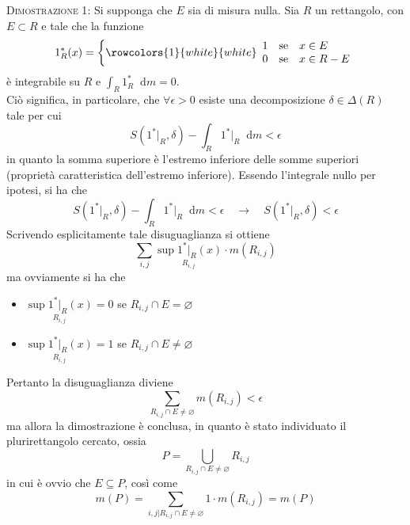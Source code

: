 \documentclass[a4paper]{extarticle}
\newcommand*\dif{\mathop{}\!\mathrm{d}}
\begin{document}
\vspace{2em}
\noindent
\normalfont \normalsize
\textsc{Dimostrazione 1}: Si supponga che $E$ sia di misura nulla. Sia $R$ un rettangolo, con $E \subset R$ e tale che la funzione
\[1^*_R(x) = \left\{\rowcolors{1}{white}{white}    
\begin{array}{lll}
    1 & \text{se} & x \in E\\
    0   & \text{se}  & x \in R - E\\
\end{array}
\right.\]
è integrabile su $R$ e $\displaystyle{\int_R 1^*_R \dif m = 0}$.\\
Ciò significa, in particolare, che $\forall \epsilon > 0$ esiste una decomposizione $\delta \in \Delta(R)$ tale per cui
\[S(1^* \vert_R, \delta) - \int_R 1^* \vert_R \dif m < \epsilon\]
in quanto la somma superiore è l'estremo inferiore delle somme superiori (proprietà caratteristica dell'estremo inferiore). Essendo l'integrale nullo per ipotesi, si ha che 
\[S(1^* \vert_R, \delta) - \int_R 1^* \vert_R \dif m < \epsilon \hspace{1em} \rightarrow \hspace{1em} S(1^* \vert_R, \delta) < \epsilon\]
Scrivendo esplicitamente tale disuguaglianza si ottiene
\[\sum_{i,j} \underset{R_{i,j}}{\sup 1^* \vert_R (x)} \cdot m(R_{i,j})\]
ma ovviamente si ha che
\begin{itemize}
    \item $\underset{R_{i,j}}{\sup 1^* \vert_R (x)} = 0$ se $R_{i,j} \cap E = \varnothing$
    \item $\underset{R_{i,j}}{\sup 1^* \vert_R (x)} = 1$ se $R_{i,j} \cap E \neq \varnothing$
\end{itemize}
Pertanto la disuguaglianza diviene
\[\sum_{R_{i,j} \cap E \neq \varnothing} m(R_{i,j}) < \epsilon\]
ma allora la dimostrazione è conclusa, in quanto è stato individuato il plurirettangolo cercato, ossia
\[P=\bigcup_{R_{i,j} \cap E \neq \varnothing} R_{i,j}\]
in cui è ovvio che $E \subseteq P$, così come
\[m(P) = \sum_{i,j \vert R_{i,j} \cap E \neq \varnothing} 1 \cdot m(R_{i,j}) = m(P)\]
\end{document}
